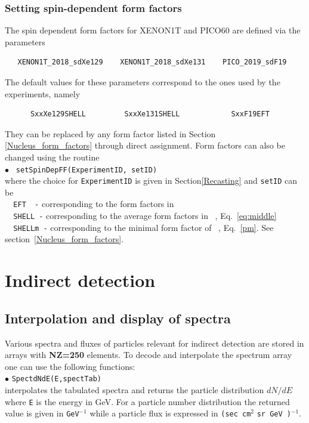 \documentclass[12pt,a4paper]{article}
\begin{document}
\subsubsection{Setting spin-dependent form factors}  
\label{SDmin}

The spin dependent form factors for XENON1T and PICO60  are defined via the parameters 
\begin{verbatim}
   XENON1T_2018_sdXe129    XENON1T_2018_sdXe131    PICO_2019_sdF19
\end{verbatim}
The default values for these parameters correspond to the ones used by the experiments, namely   
\begin{verbatim}
      SxxXe129SHELL         SxxXe131SHELL            SxxF19EFT  
\end{verbatim}
They can be replaced by any form factor listed  in Section \ref{Nucleus_form_factors} through direct
assignment. Form factors can also be changed using the routine  \\
\noindent
$\bullet$ \verb| setSpinDepFF(ExperimentID, setID)|\\
where the choice for \verb|ExperimentID| is given in Section\ref{Recasting} 
and \verb|setID| can be \\
 \verb|  EFT  -|  corresponding to  the form factors in ~\cite{Fitzpatrick:2012ix}\\
  \verb|  SHELL -|  corresponding to  the average form factors in ~\cite{Klos:2013rwa}, Eq.~\ref{eq:middle}\\
  \verb|  SHELLm -|  corresponding to the  minimal form factor of  ~\cite{Klos:2013rwa}, Eq.~\ref{pm}.  See section~\ref{Nucleus_form_factors}.

  
\section{Indirect detection}

\subsection{Interpolation and display of spectra}
Various spectra and fluxes  of particles  relevant for indirect detection are stored in
arrays with {\bf NZ=250} elements. To decode and interpolate the spectrum array
one can use the following functions:\\

\noindent
$\bullet$  \verb|SpectdNdE(E,spectTab)|\\
interpolates the tabulated spectra  and returns the 
particle distribution $dN/dE$  where \verb|E| is the energy  in GeV. 
For a particle number  distribution the returned value is given in \verb|GeV|$^{-1}$
while  a particle flux is expressed in \verb|(sec cm|$^2$ \verb|sr GeV )|$^{-1}$.\\
\end{document}

